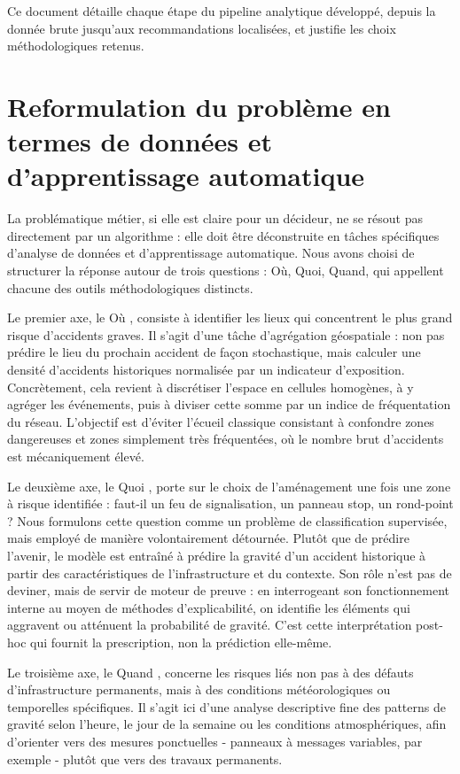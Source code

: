 \documentclass[12pt, a4paper]{article}
\begin{document}
Ce document détaille chaque étape du pipeline analytique développé, depuis la donnée brute jusqu'aux recommandations localisées, et justifie les choix méthodologiques retenus.

\section{Reformulation du problème en termes de données et d'apprentissage automatique}

La problématique métier, si elle est claire pour un décideur, ne se résout pas directement par un algorithme : elle doit être déconstruite en tâches spécifiques d'analyse de données et d'apprentissage automatique. Nous avons choisi de structurer la réponse autour de trois questions : Où, Quoi, Quand, qui appellent chacune des outils méthodologiques distincts.

Le premier axe, le \og Où \fg{}, consiste à identifier les lieux qui concentrent le plus grand risque d'accidents graves. Il s'agit d'une tâche d'agrégation géospatiale : non pas prédire le lieu du prochain accident de façon stochastique, mais calculer une densité d'accidents historiques normalisée par un indicateur d'exposition. Concrètement, cela revient à discrétiser l'espace en cellules homogènes, à y agréger les événements, puis à diviser cette somme par un indice de fréquentation du réseau. L'objectif est d'éviter l'écueil classique consistant à confondre zones dangereuses et zones simplement très fréquentées, où le nombre brut d'accidents est mécaniquement élevé.

Le deuxième axe, le \og Quoi \fg{}, porte sur le choix de l'aménagement une fois une zone à risque identifiée : faut-il un feu de signalisation, un panneau stop, un rond-point ? Nous formulons cette question comme un problème de classification supervisée, mais employé de manière volontairement détournée. Plutôt que de prédire l'avenir, le modèle est entraîné à prédire la gravité d'un accident historique à partir des caractéristiques de l'infrastructure et du contexte. Son rôle n'est pas de deviner, mais de servir de moteur de preuve : en interrogeant son fonctionnement interne au moyen de méthodes d'explicabilité, on identifie les éléments qui aggravent ou atténuent la probabilité de gravité. C'est cette interprétation post-hoc qui fournit la prescription, non la prédiction elle-même.

Le troisième axe, le \og Quand \fg{}, concerne les risques liés non pas à des défauts d'infrastructure permanents, mais à des conditions météorologiques ou temporelles spécifiques. Il s'agit ici d'une analyse descriptive fine des patterns de gravité selon l'heure, le jour de la semaine ou les conditions atmosphériques, afin d'orienter vers des mesures ponctuelles - panneaux à messages variables, par exemple - plutôt que vers des travaux permanents.
\end{document}
